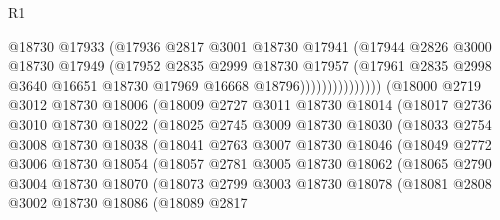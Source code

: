 \begin{lexlean}{R1}
\begin{coremodule}
                              @18730
                              @17933
                              (@17936
                                @2817
                                @3001
                                @18730
                                @17941
                                (@17944
                                  @2826
                                  @3000
                                  @18730
                                  @17949
                                  (@17952
                                    @2835
                                    @2999
                                    @18730
                                    @17957
                                    (@17961
                                      @2835
                                      @2998
                                      @3640
                                      @16651
                                      @18730
                                      @17969
                                      @16668
                                      @18796)))))))))))))))
        (@18000
          @2719
          @3012
          @18730
          @18006
          (@18009
            @2727
            @3011
            @18730
            @18014
            (@18017
              @2736
              @3010
              @18730
              @18022
              (@18025
                @2745
                @3009
                @18730
                @18030
                (@18033
                  @2754
                  @3008
                  @18730
                  @18038
                  (@18041
                    @2763
                    @3007
                    @18730
                    @18046
                    (@18049
                      @2772
                      @3006
                      @18730
                      @18054
                      (@18057
                        @2781
                        @3005
                        @18730
                        @18062
                        (@18065
                          @2790
                          @3004
                          @18730
                          @18070
                          (@18073
                            @2799
                            @3003
                            @18730
                            @18078
                            (@18081
                              @2808
                              @3002
                              @18730
                              @18086
                              (@18089
                                @2817

\end{coremodule}
\end{lexlean}

